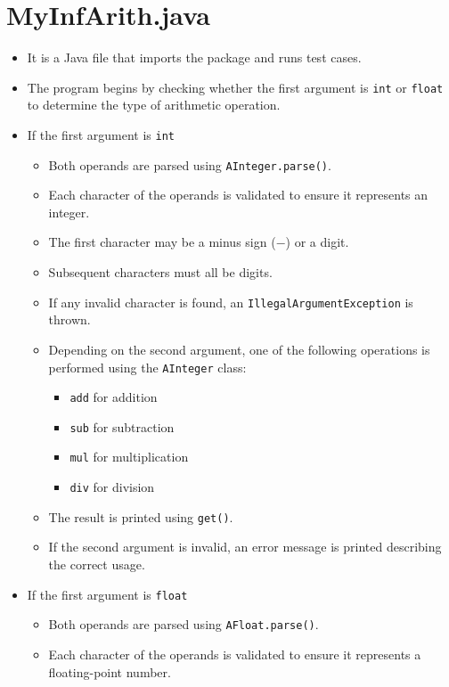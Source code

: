 \documentclass{article}
\begin{document}
\section*{MyInfArith.java}
\begin{itemize}
    \item It is a Java file that imports the package and runs test cases.
    \item The program begins by checking whether the first argument is \texttt{int} or \texttt{float} to determine the type of arithmetic operation.
    \item If the first argument is \texttt{int}
        \begin{itemize}
            \item Both operands are parsed using \texttt{AInteger.parse()}.
            \item Each character of the operands is validated to ensure it represents an integer.
            \item The first character may be a minus sign ($ - $) or a digit.
            \item Subsequent characters must all be digits.
            \item If any invalid character is found, an \texttt{IllegalArgumentException} is thrown.
            \item Depending on the second argument, one of the following operations is performed using the \texttt{AInteger} class:
                \begin{itemize}
                    \item \texttt{add} for addition
                    \item \texttt{sub} for subtraction
                    \item \texttt{mul} for multiplication
                    \item \texttt{div} for division
                \end{itemize}
            \item The result is printed using \texttt{get()}.
            \item If the second argument is invalid, an error message is printed describing the correct usage.
        \end{itemize}
    \item If the first argument is \texttt{float}
        \begin{itemize}
            \item Both operands are parsed using \texttt{AFloat.parse()}.
            \item Each character of the operands is validated to ensure it represents a floating-point number.

\end{itemize}
\end{itemize}
\end{document}

